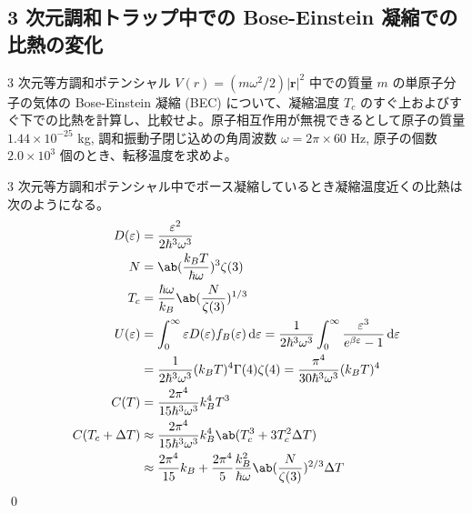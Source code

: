 \documentclass[uplatex,dvipdfmx,a4paper,11pt]{jlreq}
\makeatletter
\newcommand{\rr}{\bm{r}}
\numberwithin{equation}{section}
\theoremstyle{definition}
\renewenvironment{proof}[1][\proofname]{\par
  \normalfont
  \topsep6\p@\@plus6\p@ \trivlist
  \item[\hskip\labelsep{\bfseries #1}\@addpunct{\bfseries}]\ignorespaces\quad\par
}{%
  \qed\endtrivlist\@endpefalse
}
\renewcommand\proofname{証明}
\makeatother
\begin{document}
\setcounter{subsection}{6}
\subsection{3 次元調和トラップ中での Bose-Einstein 凝縮での比熱の変化}
\begin{problem}
3 次元等方調和ポテンシャル $V(r) = (m\omega^2/2)|\rr|^2$ 中での質量 $m$ の単原子分子の気体の Bose-Einstein 凝縮 (BEC) について、凝縮温度 $T_c$ のすぐ上およびすぐ下での比熱を計算し、比較せよ。原子相互作用が無視できるとして原子の質量 $1.44 \times 10^{-25}$ kg, 調和振動子閉じ込めの角周波数 $\omega = 2\pi \times 60$ Hz, 原子の個数 $2.0 \times 10^3$ 個のとき、転移温度を求めよ。
\end{problem}
\begin{proof}
  3 次元等方調和ポテンシャル中でボース凝縮しているとき凝縮温度近くの比熱は次のようになる。
  \begin{align}
    D(\varepsilon)    & = \frac{\varepsilon^2}{2\hbar^3\omega^3}                                                                                                                                                  \\
    N                 & = \ab(\frac{k_BT}{\hbar\omega})^3\zeta(3)                                                                                                                                                 \\
    T_c               & = \frac{\hbar\omega}{k_B}\ab(\frac{N}{\zeta(3)})^{1/3}                                                                                                                                    \\
    U(\varepsilon)    & = \int_{0}^{\infty}\varepsilon D(\varepsilon)f_B(\varepsilon)\dl{\varepsilon} = \frac{1}{2\hbar^3\omega^3}\int_{0}^{\infty}\frac{\varepsilon^3}{e^{\beta\varepsilon} - 1}\dl{\varepsilon} \\
                      & = \frac{1}{2\hbar^3\omega^3}(k_BT)^4\Gamma(4)\zeta(4) = \frac{\pi^4}{30\hbar^3\omega^3}(k_BT)^4                                                                                           \\
    C(T)              & = \frac{2\pi^4}{15\hbar^3\omega^3}k_B^4T^3                                                                                                                                                \\
    C(T_c + \Delta T) & \approx \frac{2\pi^4}{15\hbar^3\omega^3}k_B^4\ab(T_c^3 + 3T_c^2\Delta T)                                                                                                                  \\
                      & \approx \frac{2\pi^4}{15}k_B + \frac{2\pi^4}{5}\frac{k_B^2}{\hbar\omega}\ab(\frac{N}{\zeta(3)})^{2/3}\Delta T
  \end{align}
\end{proof}
\end{document}

